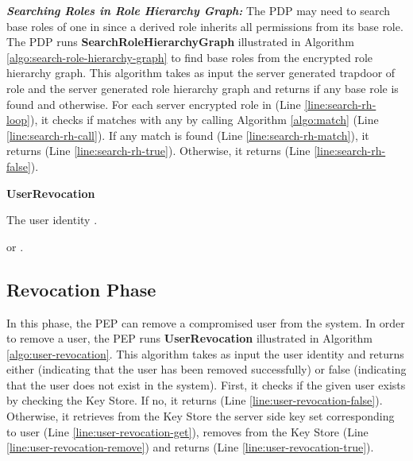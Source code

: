 \documentclass[final,5p,times,twocolumn]{elsarticle}
\newcommand{\algofontsize}{\fontsize{7}{8}\selectfont}
\begin{document}
\emph{\textbf{Searching Roles in Role Hierarchy Graph:}}
The PDP may need to search base roles of one in  since a derived role inherits all permissions from its base role. The PDP runs \textbf{SearchRoleHierarchyGraph} illustrated in Algorithm \ref{algo:search-role-hierarchy-graph} to find base roles from the encrypted role hierarchy graph. This algorithm takes as input the server generated trapdoor of role  and the server generated role hierarchy graph  and returns  if any base role is found and  otherwise. For each server encrypted role  in  (Line \ref{line:search-rh-loop}), it checks if  matches with any  by calling Algorithm \ref{algo:match} (Line \ref{line:search-rh-call}). If any match is found (Line \ref{line:search-rh-match}), it returns  (Line \ref{line:search-rh-true}). Otherwise, it returns  (Line \ref{line:search-rh-false}).




\begin{algorithm}[htp]
{\algofontsize
\caption{\textbf{UserRevocation}}

\label{algo:user-revocation}

\begin{algorithmic}[1]

\REQUIRE The user identity .

\ENSURE  or .

\medskip

\IF {} \label{line:user-revocation-exist}

	\RETURN  \label{line:user-revocation-false}

\ENDIF

\STATE  \label{line:user-revocation-get}
\STATE  \label{line:user-revocation-remove}

\RETURN  \label{line:user-revocation-true}

\end{algorithmic}
}
\end{algorithm}


\subsection{Revocation Phase}
In this phase, the PEP can remove a compromised user from the system. In order to remove a user, the PEP runs \textbf{UserRevocation} illustrated in Algorithm \ref{algo:user-revocation}. This algorithm takes as input the user identity  and returns either  (indicating that the user has been removed successfully) or false (indicating that the user does not exist in the system). First, it checks if the given user exists by checking the Key Store. If no, it returns  (Line \ref{line:user-revocation-false}). Otherwise, it retrieves from the Key Store the server side key set  corresponding to user  (Line \ref{line:user-revocation-get}), removes  from the Key Store (Line \ref{line:user-revocation-remove}) and returns  (Line \ref{line:user-revocation-true}).
\end{document}
